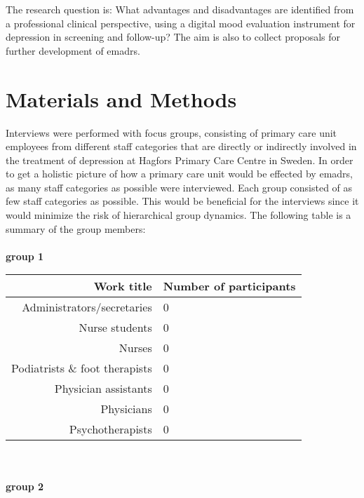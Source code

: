 \documentclass[12pt,a4paper,oneside]{article}
\renewcommand{\_}{\hspace{0.1cm}}
\let\oldcite\cite
\renewcommand*\cite[1]{\textsuperscript{\oldcite{#1}}}
\begin{document}
The research question is: What advantages and disadvantages are identified from a professional clinical perspective, using a digital mood evaluation instrument for depression in screening and follow-up? The aim is also to collect proposals for further development of e{\sc madrs}.

\section*{Materials and Methods}
Interviews were performed with {} focus groups, consisting of {} primary care unit employees from different staff categories that are directly or indirectly involved in the treatment of depression at Hagfors Primary Care Centre in Sweden. In order to get a holistic picture of how a primary care unit would be effected by e{\sc madrs}, as many staff categories as possible were interviewed\cite{goal1}. Each group consisted of as few staff categories as possible. This would be beneficial for the interviews since it would minimize the risk of hierarchical group dynamics. The following table is a summary of the group members:\\\\
{\bf group 1}\\
\begin{tabular}{r|l}
Work title & Number of participants\\
\hline
Administrators/secretaries & 0\\
Nurse students & 0\\
Nurses & 0\\
Podiatrists \& foot therapists & 0\\
Physician assistants & 0\\
Physicians & 0\\
Psychotherapists & 0\\
\hline
\end{tabular}\\\ \\
{\bf group 2}\\
\end{document}
